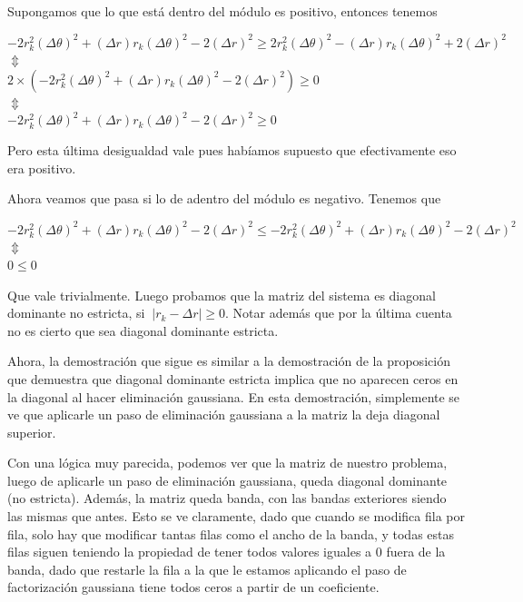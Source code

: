 Supongamos que lo que está dentro del módulo es positivo, entonces tenemos

\begin{center}
$-2 r_k^2 (\Delta \theta)^2 + (\Delta r) r_k (\Delta \theta)^2 - 2 (\Delta r)^2 \geq
2 r_k^2 (\Delta \theta)^2 - (\Delta r) r_k (\Delta \theta)^2 + 2 (\Delta r)^2$ \\
$\Updownarrow$\\
$2\times (-2 r_k^2 (\Delta \theta)^2 + (\Delta r) r_k (\Delta \theta)^2 - 2 (\Delta r)^2) \geq 0$\\
$\Updownarrow$\\
$-2 r_k^2 (\Delta \theta)^2 + (\Delta r) r_k (\Delta \theta)^2 - 2 (\Delta r)^2 \geq 0$
\end{center}

Pero esta última desigualdad vale pues habíamos supuesto que efectivamente eso era positivo.

Ahora veamos que pasa si lo de adentro del módulo es negativo. Tenemos que 

\begin{center}
$-2 r_k^2 (\Delta \theta)^2 + (\Delta r) r_k (\Delta \theta)^2 - 2 (\Delta r)^2 \leq
-2 r_k^2 (\Delta \theta)^2 + (\Delta r) r_k (\Delta \theta)^2 - 2 (\Delta r)^2$ \\
$\Updownarrow$\\
$0 \leq 0$\\
\end{center}

Que vale trivialmente. Luego probamos que la matriz del sistema es diagonal dominante no estricta, si $~{\left\vert r_k - \Delta r \right\vert \geq 0}$. Notar además que por la última cuenta no es cierto que sea diagonal dominante estricta.


Ahora, la demostración que sigue es similar a la demostración de la proposición que demuestra que diagonal dominante estricta implica que no aparecen ceros en la diagonal al hacer eliminación gaussiana. En esta demostración, simplemente se ve que aplicarle un paso de eliminación gaussiana a la matriz la deja diagonal superior.

Con una lógica muy parecida, podemos ver que la matriz de nuestro problema, luego de aplicarle un paso de eliminación gaussiana, queda diagonal dominante (no estricta). Además, la matriz queda banda, con las bandas exteriores siendo las mismas que antes. Esto se ve claramente, dado que cuando se modifica fila por fila, solo hay que modificar tantas filas como el ancho de la banda, y todas estas filas siguen teniendo la propiedad de tener todos valores iguales a 0 fuera de la banda,
dado que restarle la fila a la que le estamos aplicando el paso de factorización gaussiana tiene todos ceros a partir de un coeficiente.

